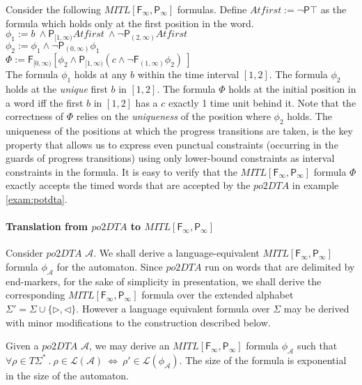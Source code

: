 \documentclass{llncs}
\newcommand{\fut}{\textsf{F}}
\newcommand{\past}{\textsf{P}}
\newcommand{\rend}{\triangleleft}
\newcommand{\lend}{\triangleright}
\newcommand{\potdta}{\mbox{$\mathit{po2DTA}$}}
\newcommand{\autm}{\mathcal A}
\newcommand{\mitlfpinf}{\mbox{$\mathit{MITL[\fut_\infty,\past_\infty]}$}}
\begin{document}
Consider the following \mitlfpinf\/ formulas. Define $Atfirst := \neg \past\top$ as the formula which holds only at the first position in the word.\\
\hspace*{1cm}
$\phi_1 := b ~\land \past_{[1,\infty)}Atfirst ~\land \neg\past_{(2,\infty)}Atfirst$\\
\hspace*{1cm}
$\phi_2 := \phi_1 \land \neg\past_{(0,\infty)}\phi_1$\\
\hspace*{1cm}
$\Phi := \fut_{[0,\infty)} [\phi_2\land \past_{[1,\infty)}(c\land 
\neg\fut_{(1,\infty)}\phi_2 )~]$ \\
The formula $\phi_1$ holds at any $b$ within the time interval $[1,2]$. The formula $\phi_2$ holds at the \textit{unique} first $b$ in $[1,2]$. The formula $\Phi$ holds at the initial position in a word iff the first $b$ in $[1,2]$ has a $c$ exactly 1 time unit behind it. Note that the correctness of $\Phi$ relies on the \emph{uniqueness} of the position where $\phi_2$ holds. The uniqueness of the positions at which the progress transitions are taken, is the key property that allows us to express even punctual constraints (occurring in the guards of progress transitions) using only lower-bound constraints as interval constraints in the formula. It is easy to verify that the \mitlfpinf\/ formula $\Phi$ exactly accepts the timed words that are accepted by the \potdta\/ in example \ref{exam:potdta}.

\paragraph{Translation from \potdta\/ to \mitlfpinf\\}
Consider  \potdta\/ $\autm$. We shall derive a language-equivalent \mitlfpinf\/ formula $\phi_\autm$ for the automaton. Since \potdta\/ run on words that are delimited by end-markers, for the sake of simplicity in presentation, we shall derive the corresponding \mitlfpinf\/ formula over the extended alphabet $\Sigma'=\Sigma \cup \{\lend,\rend\}$. However a language equivalent formula over $\Sigma$ may be derived with minor modifications to the construction described below.

\begin{theorem}
Given a \potdta\/ $\autm$, we may derive an \mitlfpinf\/ formula $\phi_\autm$ such that $\forall \rho\in T\Sigma^* ~.~ \rho\in \mathcal L(\autm) ~\Leftrightarrow~ \rho'\in \mathcal L(\phi_\autm)$. The size of the formula is exponential in the size of the automaton.
\end{theorem}
\end{document}

